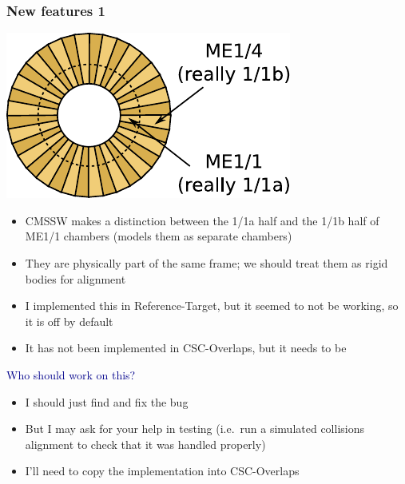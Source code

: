 \documentclass[compress]{beamer}
\begin{document}
\begin{frame}
\frametitle{New features 1}

\vspace{-0.5 cm}
\hspace{3 cm} \includegraphics[width=0.25\linewidth]{me11.pdf}

\begin{itemize}
\item CMSSW makes a distinction between the 1/1a half and the 1/1b half of ME1/1 chambers (models them as separate chambers)
\item They are physically part of the same frame; we should treat them as rigid bodies for alignment
\item I implemented this in Reference-Target, but it seemed to not be working, so it is off by default
\item It has not been implemented in CSC-Overlaps, but it needs to be
\end{itemize}

\vfill
\hspace{-0.83 cm} \textcolor{darkblue}{\Large Who should work on this?}
\begin{itemize}
\item I should just find and fix the bug
\item But I may ask for your help in testing (i.e.\ run a simulated collisions alignment to check that it was handled properly)
\item I'll need to copy the implementation into CSC-Overlaps
\end{itemize}
\end{frame}
\end{document}
